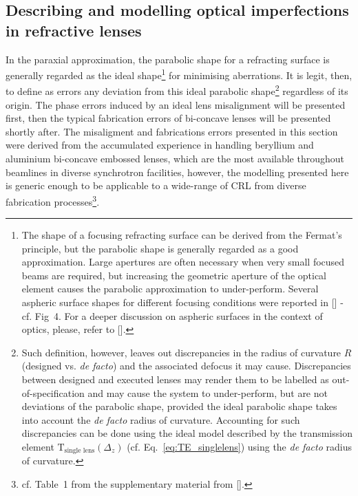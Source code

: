 \begin{refsection}
\section{Describing and modelling optical imperfections in refractive lenses}

In the paraxial approximation, the parabolic shape for a refracting surface is generally regarded as the ideal shape\footnote{The shape of a focusing refracting surface can be derived from the Fermat's principle, but the parabolic shape is generally regarded as a good approximation. Large apertures are often necessary when very small focused beams are required, but increasing the geometric aperture of the optical element causes the parabolic approximation to under-perform. Several aspheric surface shapes for different focusing conditions were reported in [\cite{SanchezdelRio2012}] - cf. Fig~4. For a deeper discussion on aspheric surfaces in the context of optics, please, refer to [\cite{Schulz1988}].} for minimising aberrations. It is legit, then, to define as errors any deviation from this ideal parabolic shape\footnote{Such definition, however, leaves out discrepancies in the radius of curvature $R$ (designed vs. \textit{de facto}) and the associated defocus it may cause. Discrepancies between designed and executed lenses may render them to be labelled as out-of-specification and may cause the system to under-perform, but are not deviations of the parabolic shape, provided the ideal parabolic shape takes into account the \textit{de facto} radius of curvature. Accounting for such discrepancies can be done using the ideal model described by the transmission element $\mathrm{T}_{\text{single lens}}(\Delta_z)$ (cf. Eq.~\ref{eq:TE_singlelens}) using the \textit{de facto} radius of curvature.} regardless of its origin. The phase errors induced by an ideal lens misalignment will be presented first, then the typical fabrication errors of bi-concave lenses will be presented shortly after. The misaligment and fabrications errors presented in this section were derived from the accumulated experience in handling beryllium and aluminium bi-concave embossed lenses, which are the most available throughout beamlines in diverse synchrotron facilities, however, the modelling presented here is generic enough to be applicable to a wide-range of CRL from diverse fabrication processes\footnote{cf. Table~1 from the supplementary material from [\cite{Roth2017}].}.  

\end{refsection}
